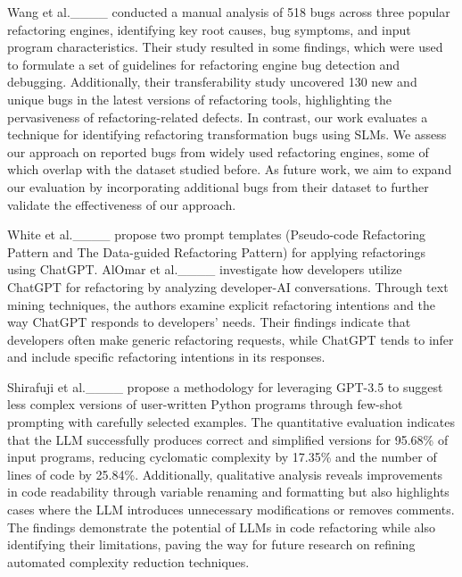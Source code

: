 Wang et al.____ conducted a manual analysis of 518 bugs across three popular refactoring engines, identifying key root causes, bug symptoms, and input program characteristics. Their study resulted in some findings, which were used to formulate a set of guidelines for refactoring engine bug detection and debugging. Additionally, their transferability study uncovered 130 new and unique bugs in the latest versions of refactoring tools, highlighting the pervasiveness of refactoring-related defects.
In contrast, our work evaluates a technique for identifying refactoring transformation bugs using SLMs. We assess our approach on \bugs{} reported bugs from widely used refactoring engines, some of which overlap with the dataset studied before. As future work, we aim to expand our evaluation by incorporating additional bugs from their dataset to further validate the effectiveness of our approach.

White et al.____ propose two prompt templates (Pseudo-code Refactoring Pattern and The Data-guided Refactoring Pattern) for applying refactorings using ChatGPT.
AlOmar et al.____ investigate how developers utilize ChatGPT for refactoring by analyzing developer-AI conversations. Through text mining techniques, the authors examine explicit refactoring intentions and the way ChatGPT responds to developers' needs. Their findings indicate that developers often make generic refactoring requests, while ChatGPT tends to infer and include specific refactoring intentions in its responses. 

Shirafuji et al.____ propose a methodology for leveraging GPT-3.5 to suggest less complex versions of user-written Python programs through few-shot prompting with carefully selected examples. The quantitative evaluation indicates that the LLM successfully produces correct and simplified versions for 95.68\% of input programs, reducing cyclomatic complexity by 17.35\% and the number of lines of code by 25.84\%. Additionally, qualitative analysis reveals improvements in code readability through variable renaming and formatting but also highlights cases where the LLM introduces unnecessary modifications or removes comments. The findings demonstrate the potential of LLMs in code refactoring while also identifying their limitations, paving the way for future research on refining automated complexity reduction techniques.

